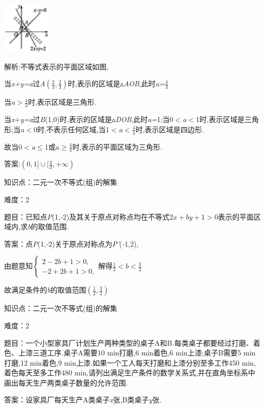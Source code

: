 \documentclass{article} %
\begin{document}
 \includegraphics*[width=0.95in, height=0.98in, keepaspectratio=false]{image1559}

 解析:不等式表示的平面区域如图,

当\textit{x+y=a}过\textit{A}$(\frac{2}{3},\frac{2}{3})$时,表示的区域是$\mathrm{\vartriangle}$\textit{AOB},此时\textit{a=}$\frac{4}{3}$

当\textit{a$>\frac{4}{3}$}时,表示区域是三角形\textit{.}

当\textit{x$+$y=a}过\textit{B}(1,0)时,表示的区域是$\mathrm{\vartriangle}$\textit{DOB},此时\textit{a=}1;当0\textit{$<$a$<$}1时,表示区域是三角形;当\textit{a$<$}0时,不表示任何区域,当1\textit{$<$a$<\frac{4}{3}$}时,表示区域是四边形\textit{.}

故当0\textit{$<$a}$\mathrm{\le}$1或$a \ge \frac{4}{3}$时,表示的平面区域为三角形\textit{.}

 答案:$(0,1]\cup [ \frac{4}{3},+\infty)$

知识点：二元一次不等式(组)的解集

难度：2

 题目：已知点\textit{P}(1,\textit{-}2)及其关于原点对称点均在不等式2\textit{$x+by+$}1\textit{$>$}0表示的平面区域内,求\textit{b}的取值范围\textit{.}

 答案：点\textit{P}(1,\textit{-}2)关于原点对称点为\textit{P'}(\textit{-}1,2),

由题意知$
\begin{cases}
2-2b+1 >0,\\
-2+2b +1>0,
\end{cases}$解得$\frac{1}{2}<b<\frac{3}{2}$

故满足条件的\textit{b}的取值范围$(\frac{1}{2},\frac{3}{2})$

知识点：二元一次不等式(组)的解集

难度：2

 题目：一个小型家具厂计划生产两种类型的桌子A和B\textit{.}每类桌子都要经过打磨、着色、上漆三道工序\textit{.}桌子A需要10 min打磨,6 min着色,6 min上漆;桌子B需要5 min打磨,12 min着色,9 min上漆\textit{.}如果一个工人每天打磨和上漆分别至多工作450 min,着色每天至多工作480 min,请列出满足生产条件的数学关系式,并在直角坐标系中画出每天生产两类桌子数量的允许范围\textit{.}

 答案：设家具厂每天生产A类桌子\textit{x}张,B类桌子\textit{y}张\textit{.}
\end{document}
